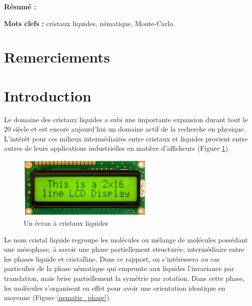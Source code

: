 \documentclass[11pt,a4paper]{article}
\numberwithin{equation}{section}
\begin{document}
\begin{titlepage}
\textbf{Résumé :} 
\vspace{0.3cm}

\textbf{Mots clefs :} cristaux liquides, nématique, Monte-Carlo.
\vspace{0.3cm}


\end{titlepage}

\newpage

\renewcommand\thepage{}

\section*{Remerciements}




\tableofcontents


\newpage
\renewcommand\thepage{\arabic{page}}
\setcounter{page}{1}



\section*{Introduction}
Le domaine des cristaux liquides a subi une importante expansion durant tout le 20 siècle et est encore aujourd'hui un domaine actif de la recherche en physique. 
L'intérêt pour ces milieux intermédiaires entre cristaux et liquides provient entre autres de leurs applications industrielles en matière d'afficheurs (Figure \ref{lcd}).

\begin{figure}[h]
    \centering	    
	\includegraphics[height=3cm]{figures/lcd.jpg}
    \caption{Un écran à cristaux liquides}
    	\label{lcd} 
\end{figure}

Le nom cristal liquide regroupe les molécules ou mélange de molécules possédant une mésophase, à savoir une phase partiellement structurée, intermédiaire entre les phases liquide et cristalline.
Dans ce rapport, on s'intéressera au cas particulier de la phase nématique qui emprunte aux liquides l'invariance par translation, mais brise partiellement la symétrie par rotation.
Dans cette phase, les molécules s'organisent en effet pour avoir une orientation identique en moyenne (Figure \ref{nematic_phase}).
\end{document}
